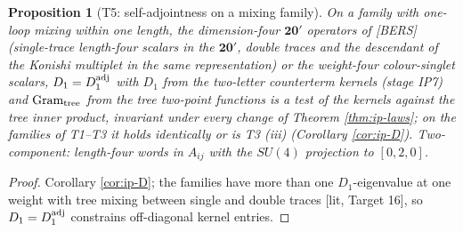 \documentclass[11pt]{report}
\theoremstyle{plain}
\newtheorem{proposition}[theorem]{Proposition}
\theoremstyle{definition}
\numberwithin{equation}{chapter}
\newcommand{\Gt}{\mathrm{Gram}_{\rm tree}}
\begin{document}
\begin{proposition}[T5: self-adjointness on a mixing family]
\label{prop:ip-mixing}
On a family with one-loop mixing within one length, the dimension-four $\mathbf{20'}$ operators of [BERS] (single-trace length-four scalars in the $\mathbf{20'}$, double traces and the descendant of the Konishi multiplet in the same representation) or the weight-four colour-singlet scalars, $D_1=D_1^{\rm adj}$ with $D_1$ from the two-letter counterterm kernels (stage IP7) and $\Gt$ from the tree two-point functions is a test of the kernels against the tree inner product, invariant under every change of Theorem \ref{thm:ip-laws}; on the families of T1--T3 it holds identically or is T3 (iii) (Corollary \ref{cor:ip-D}). Two-component: length-four words in $A_{ij}$ with the $SU(4)$ projection to $[0,2,0]$.
\end{proposition}

\begin{proof}
Corollary \ref{cor:ip-D}; the families have more than one $D_1$-eigenvalue at one weight with tree mixing between single and double traces [lit, Target 16], so $D_1=D_1^{\rm adj}$ constrains off-diagonal kernel entries.
\end{proof}
\end{document}
